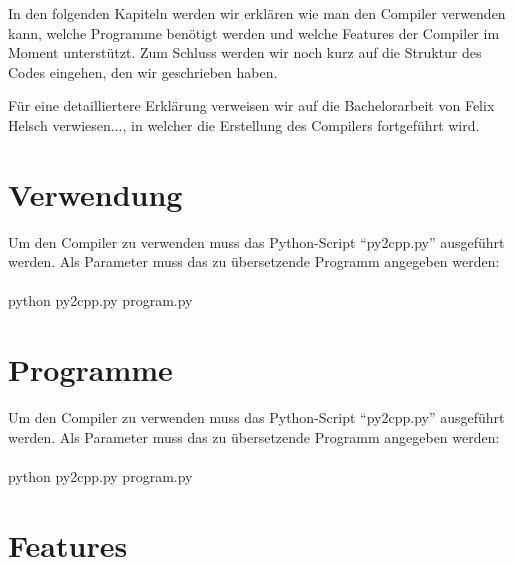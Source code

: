 

In den folgenden Kapiteln werden wir erklären wie man den Compiler verwenden kann, welche Programme benötigt werden und welche Features der Compiler im Moment unterstützt. Zum Schluss werden wir noch kurz auf die Struktur des Codes eingehen, den wir geschrieben haben.

Für eine detailliertere Erklärung verweisen wir auf die Bachelorarbeit von Felix Helsch verwiesen..., in welcher die Erstellung des Compilers fortgeführt wird.



\section{Verwendung}

Um den Compiler zu verwenden muss das Python-Script "`py2cpp.py"' ausgeführt werden. Als Parameter muss das zu übersetzende Programm angegeben werden: \\ \\
python py2cpp.py program.py\\


\section{Programme}

Um den Compiler zu verwenden muss das Python-Script "`py2cpp.py"' ausgeführt werden. Als Parameter muss das zu übersetzende Programm angegeben werden: \\ \\
python py2cpp.py program.py\\



\section{Features}

